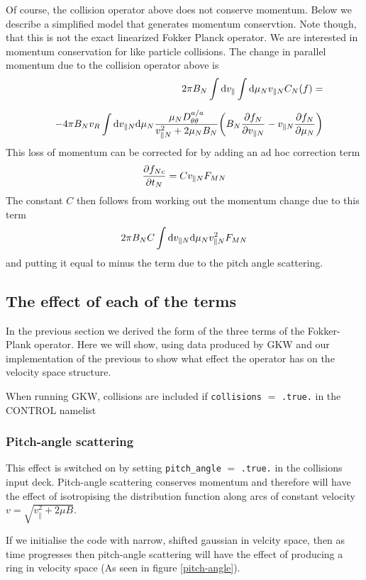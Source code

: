 \documentclass{report}
\def\be{\begin{equation}}
\def\ee{\end{equation}}
\def\bee{\begin{eqnarray}}
\def\eee{\end{eqnarray}}
\begin{document}
Of course, the collision operator above does not conserve momentum. Below we describe a simplified model 
that generates momentum conservtion. Note though, that this is not the exact linearized Fokker Planck 
operator. We are interested in momentum conservation for like particle collisions. The change in parallel 
momentum due to the collision operator above is 
\bee 
&& 2 \pi B_N \int {\rm d}v_\parallel \int {\rm d} \mu_N v_{\parallel N} C_N(f) = \cr
\noalign{\vskip 0.2truecm}
&& - 4 \pi B_N v_R \int {\rm d} v_{\parallel N} {\rm d} \mu_N {\mu_N D_{\theta \theta}^{a/a} 
\over v_{\parallel N}^2 + 2 \mu_N B_N } \biggl ( B_N {\partial f_N \over \partial v_{\parallel N} } 
- v_{\parallel N} {\partial f_N \over \partial \mu_N} \biggr ) 
\eee 
This loss of momentum can be corrected for by adding an ad hoc correction term 
\be 
{\partial f_{Nc} \over \partial t_N} = C v_{\parallel N} F_{MN} 
\ee
The constant $C$ then follows from working out the momentum change due to this term 
\be 
2 \pi B_N C \int {\rm d} v_{\parallel N} {\rm d} \mu_N v_{\parallel N}^2 F_{MN} 
\ee 
and putting it equal to minus the term due to the pitch angle scattering. 

\subsection{The effect of each of the terms}

In the previous section we derived the form of the three terms of the Fokker-Plank operator.  Here we will show, using data produced by GKW and our implementation of the previous to show what effect the operator has on the velocity space structure.

When running GKW, collisions are included if \texttt{collisions} $=$  \texttt{.true.} in the CONTROL namelist

\subsubsection{Pitch-angle scattering}

This effect is switched on by setting \texttt{pitch\_angle} $=$ \texttt{.true.} in the collisions input deck.  Pitch-angle scattering conserves momentum and therefore will have the effect of isotropising the distribution function along arcs of constant velocity $v = \sqrt{v_{\parallel}^{2} + 2\mu B}$.  

If we initialise the code with narrow, shifted gaussian in velcity space, then as time progresses then pitch-angle scattering will have the effect of producing a ring in velocity space (As seen in figure \ref{pitch-angle}).
\end{document}
